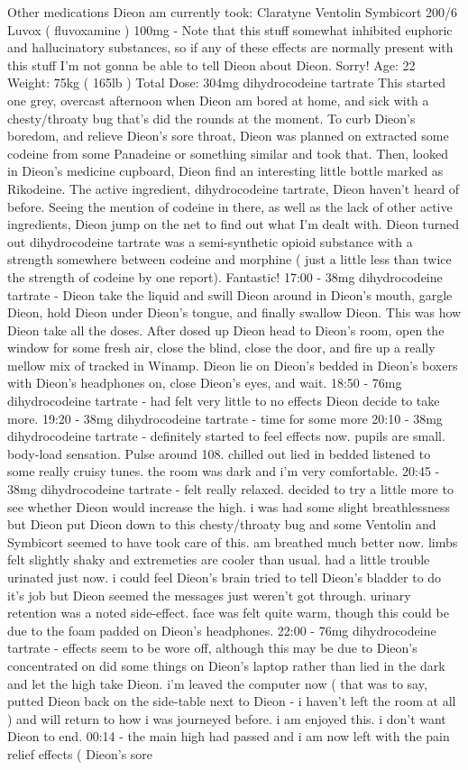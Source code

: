 \documentclass[12pt]{book}
\begin{document}
Other medications Dieon am currently took: Claratyne Ventolin Symbicort 200/6 Luvox ( fluvoxamine ) 100mg - Note that this stuff somewhat inhibited euphoric and hallucinatory substances, so if any of these effects are normally present with this stuff I'm not gonna be able to tell Dieon about Dieon. Sorry! Age: 22 Weight: 75kg ( 165lb ) Total Dose: 304mg dihydrocodeine tartrate This started one grey, overcast afternoon when Dieon am bored at home, and sick with a chesty/throaty bug that's did the rounds at the moment. To curb Dieon's boredom, and relieve Dieon's sore throat, Dieon was planned on extracted some codeine from some Panadeine or something similar and took that. Then, looked in Dieon's medicine cupboard, Dieon find an interesting little bottle marked as Rikodeine. The active ingredient, dihydrocodeine tartrate, Dieon haven't heard of before. Seeing the mention of codeine in there, as well as the lack of other active ingredients, Dieon jump on the net to find out what I'm dealt with. Dieon turned out dihydrocodeine tartrate was a semi-synthetic opioid substance with a strength somewhere between codeine and morphine ( just a little less than twice the strength of codeine by one report). Fantastic! 17:00 - 38mg dihydrocodeine tartrate - Dieon take the liquid and swill Dieon around in Dieon's mouth, gargle Dieon, hold Dieon under Dieon's tongue, and finally swallow Dieon. This was how Dieon take all the doses. After dosed up Dieon head to Dieon's room, open the window for some fresh air, close the blind, close the door, and fire up a really mellow mix of tracked in Winamp. Dieon lie on Dieon's bedded in Dieon's boxers with Dieon's headphones on, close Dieon's eyes, and wait. 18:50 - 76mg dihydrocodeine tartrate - had felt very little to no effects Dieon decide to take more. 19:20 - 38mg dihydrocodeine tartrate - time for some more 20:10 - 38mg dihydrocodeine tartrate - definitely started to feel effects now. pupils are small. body-load sensation. Pulse around 108. chilled out lied in bedded listened to some really cruisy tunes. the room was dark and i'm very comfortable. 20:45 - 38mg dihydrocodeine tartrate - felt really relaxed. decided to try a little more to see whether Dieon would increase the high. i was had some slight breathlessness but Dieon put Dieon down to this chesty/throaty bug and some Ventolin and Symbicort seemed to have took care of this. am breathed much better now. limbs felt slightly shaky and extremeties are cooler than usual. had a little trouble urinated just now. i could feel Dieon's brain tried to tell Dieon's bladder to do it's job but Dieon seemed the messages just weren't got through. urinary retention was a noted side-effect. face was felt quite warm, though this could be due to the foam padded on Dieon's headphones. 22:00 - 76mg dihydrocodeine tartrate - effects seem to be wore off, although this may be due to Dieon's concentrated on did some things on Dieon's laptop rather than lied in the dark and let the high take Dieon. i'm leaved the computer now ( that was to say, putted Dieon back on the side-table next to Dieon - i haven't left the room at all ) and will return to how i was journeyed before. i am enjoyed this. i don't want Dieon to end. 00:14 - the main high had passed and i am now left with the pain relief effects ( Dieon's sore 
\end{document}
